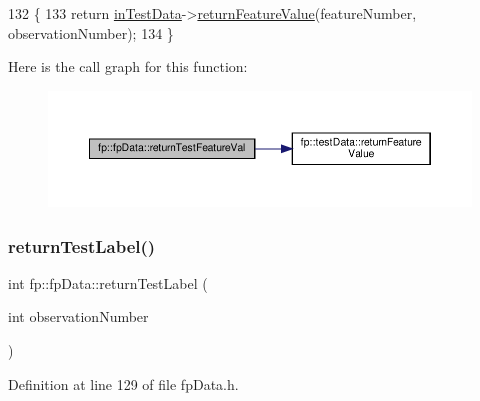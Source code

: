 \begin{DoxyCode}
132                                                                                                     \{
133                 \textcolor{keywordflow}{return} \hyperlink{classfp_1_1fpData_ad4f4dd3a8d15633b7f983932fa60bbad}{inTestData}->\hyperlink{classfp_1_1testData_a0c49c5fc2f1bf3fc39c7d55413cddabf}{returnFeatureValue}(featureNumber, 
      observationNumber);
134             \}
\end{DoxyCode}
Here is the call graph for this function\+:
\nopagebreak
\begin{figure}[H]
\begin{center}
\leavevmode
\includegraphics[width=350pt]{classfp_1_1fpData_a42f76961f1649e329d654e9e1bb13fc6_cgraph}
\end{center}
\end{figure}
\mbox{\label{classfp_1_1fpData_a50b6343c52560d1992de50e8cd6b1206}} 
\subsubsection{\texorpdfstring{return\+Test\+Label()}{returnTestLabel()}}
{\footnotesize\ttfamily int fp\+::fp\+Data\+::return\+Test\+Label (\begin{DoxyParamCaption}\item[{int}]{observation\+Number }\end{DoxyParamCaption})\hspace{0.3cm}{\ttfamily [inline]}}



Definition at line 129 of file fp\+Data.\+h.


